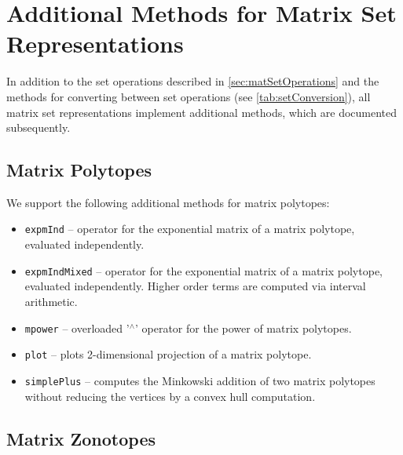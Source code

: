 \section{Additional Methods for Matrix Set Representations}

In addition to the set operations described in \cref{sec:matSetOperations} and the methods for converting between set operations (see \cref{tab:setConversion}), all matrix set representations implement additional methods, which are documented subsequently.

\subsection{Matrix Polytopes} \label{sec:matrixPolytopeOperations}

We support the following additional methods for matrix polytopes:

\begin{itemize}
 \item \texttt{expmInd} -- operator for the exponential matrix of a matrix polytope, evaluated independently.
 \item \texttt{expmIndMixed} -- operator for the exponential matrix of a matrix polytope, evaluated independently. Higher order terms are computed via interval arithmetic.
 \item \texttt{mpower} -- overloaded '${}^{\wedge}$' operator for the power of matrix polytopes.
 \item \texttt{plot} -- plots 2-dimensional projection of a matrix polytope.
 \item \texttt{simplePlus} -- computes the Minkowski addition of two matrix polytopes without reducing the vertices by a convex hull computation.
\end{itemize}



\subsection{Matrix Zonotopes} \label{sec:matrixZonotopeOperations}

